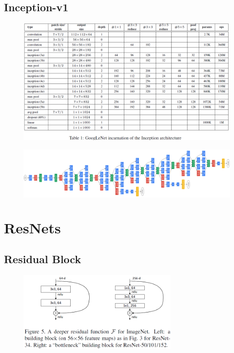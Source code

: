 \subsection{Inception-v1}

\begin{figure}[H]
    \centering
    \includegraphics[width=16cm]{images/models/googlenet.png}
    \label{fig:googlenet}
\end{figure}

\begin{figure}[H]
    \centering
    \includegraphics[width=16cm]{images/models/googlenet_arch.png}
    \label{fig:googlenet_arch}
\end{figure}

\section{ResNets}
\subsection{Residual Block}
\begin{figure}[H]
    \centering
    \includegraphics[width=8cm]{images/models/residualblock.png}
    \label{fig:residualblock}
\end{figure}

